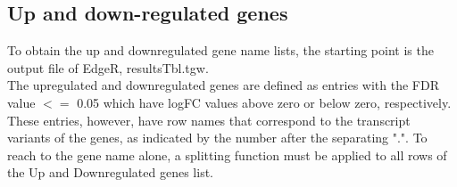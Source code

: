 \documentclass[a4paper,11pt]{article}
\begin{document}
\subsection{Up and down-regulated genes}

To obtain the up and downregulated gene name lists, the starting point is the output file of EdgeR, resultsTbl.tgw.\\
The upregulated and downregulated genes are defined as entries with the FDR value $<=$ 0.05 which have logFC values above zero or below zero, respectively. These entries, however, have row names that correspond to the transcript variants of the genes, as indicated by the number after the separating ".".
To reach to the gene name alone, a splitting function must be applied to all rows of the Up and Downregulated genes list.
\end{document}
